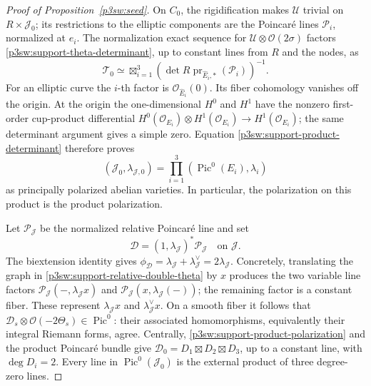\documentclass[11pt]{article}
\numberwithin{equation}{section}
\begin{document}
\begin{proof}[Proof of Proposition~\ref{p3sw:seed}]
On \(C_0\), the rigidification makes \(\mathcal U\) trivial on
\(R\times\mathcal J_0\); its restrictions to the elliptic components
are the Poincar\'e lines \(\mathcal P_i\), normalized at \(e_i\).
The normalization exact sequence for
\(\mathcal U\otimes\mathcal O(2\sigma)\) factors \eqref{p3sw:support-theta-determinant}, up to constant
lines from \(R\) and the nodes, as
\begin{equation}
 \mathcal T_0\simeq
 \mathop{\boxtimes}_{i=1}^3
 \left(\det R\operatorname{pr}_{\widehat E_i,*}(\mathcal P_i)\right)^{-1}.
 \label{p3sw:support-product-determinant}
\end{equation}
For an elliptic curve the \(i\)-th factor is
\(\mathcal O_{\widehat E_i}(0)\).  Its fiber cohomology vanishes off
the origin.  At the origin the one-dimensional \(H^0\) and \(H^1\)
have the nonzero first-order cup-product differential
\(H^0(\mathcal O_{E_i})\otimes H^1(\mathcal O_{E_i})
\to H^1(\mathcal O_{E_i})\); the same determinant argument gives
a simple zero.  Equation \eqref{p3sw:support-product-determinant} therefore proves
\begin{equation}
 (\mathcal J_0,\lambda_{\mathcal J,0})
   =\prod_{i=1}^3(\operatorname{Pic}^0(E_i),\lambda_i)
 \label{p3sw:support-product-polarization}
\end{equation}
as principally polarized abelian varieties.  In particular, the
polarization on this product is the product polarization.

Let \(\mathcal P_{\mathcal J}\) be the normalized relative Poincar\'e
line and set
\begin{equation}
 \mathcal D=(1,\lambda_{\mathcal J})^*\mathcal P_{\mathcal J}
 \quad\text{on }\mathcal J.
 \label{p3sw:support-relative-double-theta}
\end{equation}
The biextension identity gives
\(\phi_{\mathcal D}=\lambda_{\mathcal J}
 +\lambda_{\mathcal J}^{\vee}=2\lambda_{\mathcal J}\).
Concretely, translating the graph in \eqref{p3sw:support-relative-double-theta} by \(x\) produces the
two variable line factors
\(\mathcal P_{\mathcal J}(-,\lambda_{\mathcal J}x)\) and
\(\mathcal P_{\mathcal J}(x,\lambda_{\mathcal J}(-))\);
the remaining factor is a constant fiber.  These represent
\(\lambda_{\mathcal J}x\) and \(\lambda_{\mathcal J}^{\vee}x\).
On a smooth fiber it follows that
\(\mathcal D_s\otimes\mathcal O(-2\Theta_s)\in\operatorname{Pic}^0\):
their associated homomorphisms, equivalently their integral Riemann
forms, agree.  Centrally, \eqref{p3sw:support-product-polarization} and the product Poincar\'e bundle give
\(\mathcal D_0=D_1\boxtimes D_2\boxtimes D_3\), up to a constant
line, with \(\deg D_i=2\).  Every line in
\(\operatorname{Pic}^0(\mathcal J_0)\) is the external product of
three degree-zero lines.


\end{proof}
\end{document}
